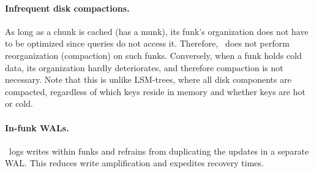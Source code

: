 \paragraph{Infrequent disk compactions.} 
As long as a chunk is cached (has a munk), its funk's organization does not have to be optimized since 
queries do not access it. Therefore, \sys\ does not perform reorganization (compaction) on such funks.
Conversely, when a funk holds cold data, its organization hardly deteriorates, and therefore compaction is not necessary.
Note that this is unlike LSM-trees, where all disk components are compacted, regardless of which keys reside in memory and whether 
keys are hot or cold. 

\paragraph{In-funk WALs.} \sys\ logs writes within funks and refrains from duplicating the updates  in a separate WAL. This reduces write amplification and expedites recovery times. 
